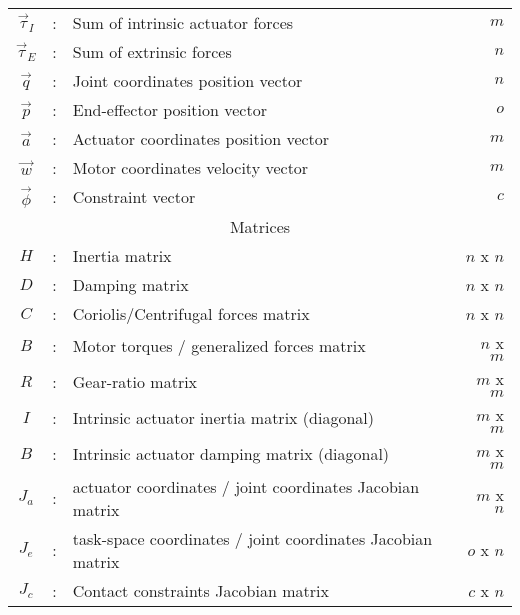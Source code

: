 \begin{table}[htbp]
\begin{tabular}{ c c l r }
			$\vec{\tau}_I$  &  :  & Sum of intrinsic actuator forces                           & $m$  \\
			$\vec{\tau}_E$  &  :  & Sum of extrinsic forces                                    & $n$  \\
			$\vec{q}$       &  :  & Joint coordinates position vector                          & $n$  \\
			$\vec{p}$       &  :  & End-effector position vector                               & $o$  \\
			$\vec{a}$       &  :  & Actuator coordinates position vector                       & $m$  \\
			$\vec{w}$       &  :  & Motor coordinates velocity vector                          & $m$  \\ 
			$\vec{\phi}$    &  :  & Constraint vector                                          & $c$  \\
			\hline \hline
			\multicolumn{4}{c}{Matrices} \\
			\hline \hline
			$H$             &  :  & Inertia matrix                                             & $n$ x $n$ \\
			$D$             &  :  & Damping matrix                                             & $n$ x $n$ \\
			$C$             &  :  & Coriolis/Centrifugal forces matrix                         & $n$ x $n$ \\
			$B$             &  :  & Motor torques / generalized forces matrix                  & $n$ x $m$ \\
			$R$             &  :  & Gear-ratio matrix                                          & $m$ x $m$ \\
			$I$             &  :  & Intrinsic actuator inertia matrix (diagonal)               & $m$ x $m$ \\
			$B$             &  :  & Intrinsic actuator damping matrix (diagonal)               & $m$ x $m$ \\
			$J_a$           &  :  & actuator coordinates / joint coordinates Jacobian matrix   & $m$ x $n$ \\
			$J_e$           &  :  & task-space coordinates / joint coordinates Jacobian matrix & $o$ x $n$ \\
			$J_c$           &  :  & Contact constraints Jacobian matrix                        & $c$ x $n$ \\ 
		\hline \hline
        \end{tabular}		
	\label{tab:nom}
\end{table}

